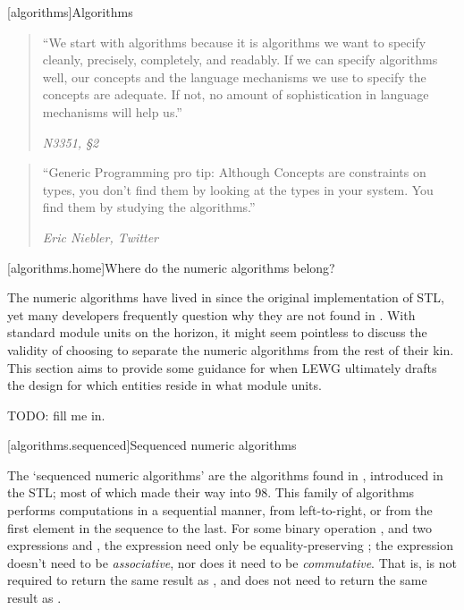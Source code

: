 [algorithms]{Algorithms}

\begin{quote}
``We start with algorithms because it is algorithms we want to specify cleanly, precisely,
completely, and readably. If we can specify algorithms well, our concepts and the language
mechanisms we use to specify the concepts are adequate. If not, no amount of sophistication in
language mechanisms will help us.''
\begin{flushright}
\textemdash \textit{N3351, §2}
\end{flushright}
\end{quote}

\begin{quote}
``Generic Programming pro tip: Although Concepts are constraints on types, you don't find them by
looking at the types in your system. You find them by studying the algorithms.''
\begin{flushright}
\textemdash \textit{Eric Niebler, Twitter}
\end{flushright}
\end{quote}

[algorithms.home]{Where do the numeric algorithms belong?}

The numeric algorithms have lived in  since the original implementation of STL, yet
many developers frequently question why they are not found in . With standard
module units on the horizon, it might seem pointless to discuss the validity of choosing to separate
the numeric algorithms from the rest of their kin. This section aims to provide some guidance for
when LEWG ultimately drafts the design for which entities reside in what module units.

TODO: fill me in.

[algorithms.sequenced]{Sequenced numeric algorithms}

The `sequenced numeric algorithms' are the algorithms found in , introduced in the
STL; most of which made their way into \Cpp{}98. This family of algorithms performs computations in
a sequential manner, from left-to-right, or from the first element in the sequence to the last.
For some binary operation , and two expressions  and , the expression
 need only be equality-preserving ; the expression
 doesn't need to be \textit{associative}, nor does it need to be
\textit{commutative}. That is,  is not required to return the same result
as , and  does not need to return the same result as
.

